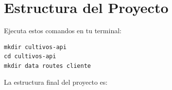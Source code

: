 \documentclass[12pt, a4paper]{article}
\begin{document}
\section{Estructura del Proyecto}

\begin{tcolorbox}[pasoStyle, title={\faFolderOpen\ Paso 1: Crear las carpetas}]
Ejecuta estos comandos en tu terminal:
\begin{lstlisting}[style=bashStyle]
mkdir cultivos-api
cd cultivos-api
mkdir data routes cliente
\end{lstlisting}
\end{tcolorbox}

La estructura final del proyecto es:
\end{document}
